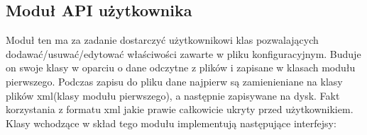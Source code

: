\documentclass{article}
\begin{document}
\subsection{Moduł API użytkownika}
Moduł ten ma za zadanie dostarczyć użytkownikowi klas pozwalających dodawać/usuwać/edytować
właściwości zawarte w pliku konfiguracyjnym.
Buduje on swoje klasy w oparciu o dane odczytne z plików i zapisane w klasach modułu pierwszego.
Podczas zapisu do pliku dane najpierw są zamienieniane na klasy plików xml(klasy modułu pierwszego),
a następnie zapisywane na dysk. Fakt korzystania z formatu xml jakie prawie całkowicie ukryty przed użytkownikiem.
Klasy wchodzące w skład tego modułu implementują następujące interfejsy:

\newpage


\end{document}
